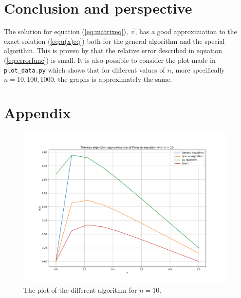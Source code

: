 \documentclass{article}
\begin{document}
\vspace{1cm}

\section{Conclusion and perspective}

  The solution for equation (\ref{eq:matrixeq}), $\vec{v}$, has a good approximation to the exact solution (\ref{eq:u(x)eq}) both for the general algorithm and the special algorithm. This is proven by that the relative error described in equation (\ref{eq:errorfunc}) is small. It is also possible to consider the plot made in \texttt{plot\_data.py} which shows that for different values of $n$, more specifically $n = 10, 100, 1000$, the graphs is approximately the same.



\vspace{1cm}

\section{Appendix}


\begin{figure}[ht]
	\centering
	\includegraphics[width = 11cm]{program/data10.png}
	\caption{The plot of the different algorithm for $n = 10$. }
	\label{fig:data10png}
\end{figure}
\end{document}
